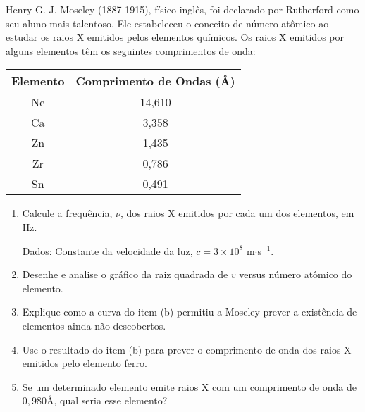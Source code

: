 Henry G. J. Moseley (1887-1915), físico inglês, foi declarado por Rutherford como seu aluno mais talentoso. Ele estabeleceu o conceito de número atômico ao estudar os raios X emitidos pelos elementos químicos. Os raios X emitidos por alguns elementos têm os seguintes comprimentos de onda:

\begin{center}
\renewcommand{\arraystretch}{1.5}
\begin{tabular}{c c}
	\hline
	Elemento & Comprimento de Ondas (\AA) \\
	\hline
	Ne & 14,610 \\
	Ca & 3,358 \\
	Zn & 1,435\\
	Zr & 0,786 \\
	Sn & 0,491 \\
	\hline
\end{tabular}
\end{center}

\begin{enumerate}[label = (\alph*)]
	\item Calcule a frequência, $\nu$, dos raios X emitidos por cada um dos elementos, em Hz.

Dados: Constante da velocidade da luz, $c = 3 \times 10^{8}$ m$\cdot$s$^{-1}$.

	\item Desenhe e analise o gráfico da raiz quadrada de $v$ versus número atômico do elemento.
	\item Explique como a curva do item (b) permitiu a Moseley prever a existência de elementos ainda não descobertos.
	\item Use o resultado do item (b) para prever o comprimento de onda dos raios X emitidos pelo elemento ferro. 
	\item Se um determinado elemento emite raios X com um comprimento de onda de $0,980 Å$, qual seria esse elemento?
\end{enumerate}
